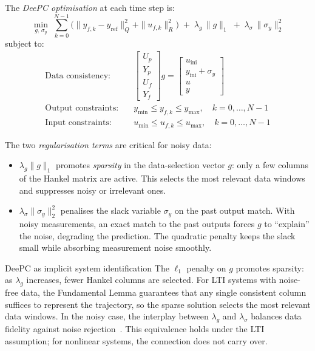 The \emph{DeePC optimisation} at each time step is:
\begin{equation}\label{eq:deepc_qp}
	\min_{g,\, \sigma_y} \; \sum_{k=0}^{N-1}\bigl(\|y_{f,k} - y_\text{ref}\|_Q^2 + \|u_{f,k}\|_R^2\bigr) \;+\; \lambda_g\,\|g\|_1 \;+\; \lambda_\sigma\,\|\sigma_y\|_2^2
\end{equation}
subject to:
\begin{align*}
	\text{Data consistency:} \quad & \begin{bmatrix} U_p \\ Y_p \\ U_f \\ Y_f \end{bmatrix} g = \begin{bmatrix} u_\text{ini} \\ y_\text{ini} + \sigma_y \\ u \\ y \end{bmatrix} \\[4pt]
	\text{Output constraints:} \quad & y_{\min} \le y_{f,k} \le y_{\max}, \quad k = 0, \ldots, N-1 \\
	\text{Input constraints:} \quad & u_{\min} \le u_{f,k} \le u_{\max}, \quad k = 0, \ldots, N-1
\end{align*}

The two \emph{regularisation terms} are critical for noisy data:
\begin{itemize}
	\item $\lambda_g\|g\|_1$ promotes \emph{sparsity} in the data-selection vector $g$: only a few columns of the Hankel matrix are active. This selects the most relevant data windows and suppresses noisy or irrelevant ones.
	\item $\lambda_\sigma\|\sigma_y\|_2^2$ penalises the slack variable $\sigma_y$ on the past output match. With noisy measurements, an exact match to the past outputs forces $g$ to ``explain'' the noise, degrading the prediction. The quadratic penalty keeps the slack small while absorbing measurement noise smoothly.
\end{itemize}

\begin{defnbox}{DeePC as implicit system identification}
	The $\ell_1$ penalty on $g$ promotes sparsity: as $\lambda_g$ increases, fewer Hankel columns are selected. For LTI systems with noise-free data, the Fundamental Lemma guarantees that any single consistent column suffices to represent the trajectory, so the sparse solution selects the most relevant data windows. In the noisy case, the interplay between $\lambda_g$ and $\lambda_\sigma$ balances data fidelity against noise rejection~\cite{Dorfler2023}. This equivalence holds under the LTI assumption; for nonlinear systems, the connection does not carry over.
\end{defnbox}

